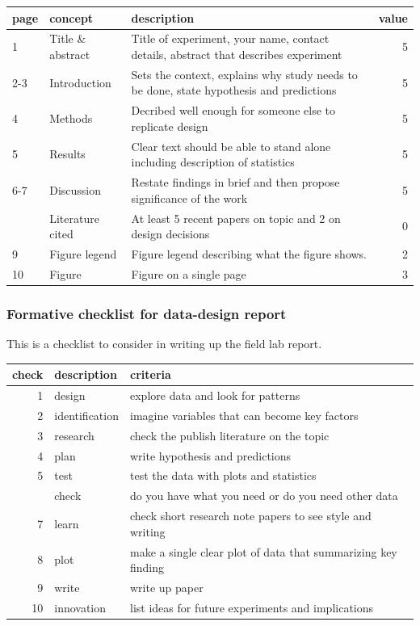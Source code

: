\documentclass[
]{book}
\begin{document}
\begin{tabular}{lllr}
\toprule
page & concept & description & value\\
\midrule
1 & Title \& abstract & Title of experiment, your name, contact details, abstract that describes experiment & 5\\
2-3 & Introduction & Sets the context, explains why study needs to be done, state hypothesis and predictions & 5\\
4 & Methods & Decribed well enough for someone else to replicate design & 5\\
5 & Results & Clear text should be able to stand alone including description of statistics & 5\\
6-7 & Discussion & Restate findings in brief and then propose significance of the work & 5\\
\addlinespace
8 & Literature cited & At least 5 recent papers on topic and 2 on design decisions & 0\\
9 & Figure legend & Figure legend describing what the figure shows. & 2\\
10 & Figure & Figure on a single page & 3\\
\bottomrule
\end{tabular}

\hypertarget{formative-checklist-for-data-design-report}{%
\subsubsection*{Formative checklist for data-design report}\label{formative-checklist-for-data-design-report}}

This is a checklist to consider in writing up the field lab report.

\begin{tabular}{rll}
\toprule
check & description & criteria\\
\midrule
1 & design & explore data and look for patterns\\
2 & identification & imagine variables that can become key factors\\
3 & research & check the publish literature on the topic\\
4 & plan & write hypothesis and predictions\\
5 & test & test the data with plots and statistics\\
\addlinespace
6 & check & do you have what you need or do you need other data\\
7 & learn & check short research note papers to see style and writing\\
8 & plot & make a single clear plot of data that summarizing key finding\\
9 & write & write up paper\\
10 & innovation & list ideas for future experiments and implications\\
\bottomrule
\end{tabular}
\end{document}
